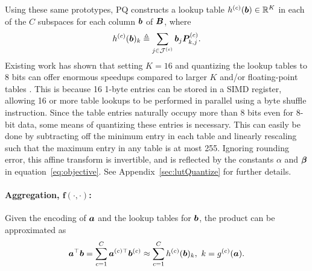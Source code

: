 Using these same prototypes, PQ constructs a lookup table $h^{(c)}(\bm{b}) \in \mathbb{R}^K$ in each of the $C$ subspaces for each column $\bm{b}$ of $\bm{B}$, where
\begin{align}
    h^{(c)}(\bm{b})_k \triangleq \sum_{j\in \mathcal{J}^{(c)}} \bm{b}_j \bm{P}^{(c)}_{k,j}.
\end{align}
Existing work has shown that setting $K = 16$ and quantizing the lookup tables to 8 bits can offer enormous speedups compared to larger $K$ and/or floating-point tables \cite{bolt, quickAdc, quickerAdc}. This is because 16 1-byte entries can be stored in a SIMD register, allowing 16 or more table lookups to be performed in parallel using a byte shuffle instruction. Since the table entries naturally occupy more than 8 bits even for 8-bit data, some means of quantizing these entries is necessary. This can easily be done by subtracting off the minimum entry in each table and linearly rescaling such that the maximum entry in any table is at most 255. Ignoring rounding error, this affine transform is invertible, and is reflected by the constants $\alpha$ and $\bm{\beta}$ in equation~\ref{eq:objective}. See Appendix~\ref{sec:lutQuantize} for further details.


\paragraph{Aggregation, $\bm{f(\cdot,\cdot)}$:}

Given the encoding of $\bm{a}$ and the lookup tables for $\bm{b}$, the product can be approximated as
\vspace*{-2mm}
\begin{align}
    \bm{a}^\top \bm{b} = \sum_{c=1}^C \bm{a}^{(c)\top} \bm{b}^{(c)} \approx \sum_{c=1}^C h^{(c)}(\bm{b})_k, \text{ }k = g^{(c)}(\bm{a}).
\end{align}

